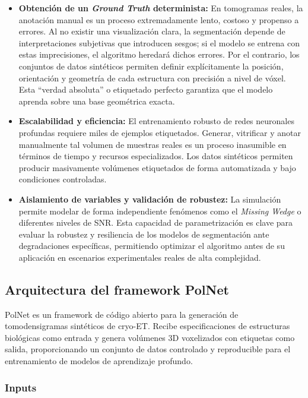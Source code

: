 \begin{itemize}
    \item \textbf{Obtención de un \textit{Ground Truth} determinista:} En tomogramas reales, la anotación manual es un proceso extremadamente lento, costoso y propenso a errores. Al no existir una visualización clara, la segmentación depende de interpretaciones subjetivas que introducen sesgos; si el modelo se entrena con estas imprecisiones, el algoritmo heredará dichos errores. Por el contrario, los conjuntos de datos sintéticos permiten definir explícitamente la posición, orientación y geometría de cada estructura con precisión a nivel de vóxel. Esta ``verdad absoluta'' o etiquetado perfecto garantiza que el modelo aprenda sobre una base geométrica exacta.
    
    \item \textbf{Escalabilidad y eficiencia:} El entrenamiento robusto de redes neuronales profundas requiere miles de ejemplos etiquetados. Generar, vitrificar y anotar manualmente tal volumen de muestras reales es un proceso inasumible en términos de tiempo y recursos especializados. Los datos sintéticos permiten producir masivamente volúmenes etiquetados de forma automatizada y bajo condiciones controladas.

    \item \textbf{Aislamiento de variables y validación de robustez:} La simulación permite modelar de forma independiente fenómenos como el \textit{Missing Wedge} o diferentes niveles de SNR. Esta capacidad de parametrización es clave para evaluar la robustez y resiliencia de los modelos de segmentación ante degradaciones específicas, permitiendo optimizar el algoritmo antes de su aplicación en escenarios experimentales reales de alta complejidad.
\end{itemize}

\subsection{Arquitectura del framework PolNet}
PolNet es un framework de código abierto para la generación de tomodensigramas sintéticos de cryo-ET. Recibe especificaciones de estructuras biológicas como entrada y genera volúmenes 3D voxelizados con etiquetas como salida, proporcionando un conjunto de datos controlado y reproducible para el entrenamiento de modelos de aprendizaje profundo.

\subsubsection{Inputs}

